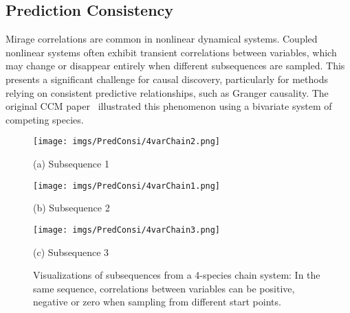 \subsection{Prediction Consistency}

Mirage correlations are common in nonlinear dynamical systems. Coupled nonlinear systems often exhibit transient correlations between variables, which may change or disappear entirely when different subsequences are sampled. This presents a significant challenge for causal discovery, particularly for methods relying on consistent predictive relationships, such as Granger causality. The original CCM paper~\cite{sugihara2012detecting} illustrated this phenomenon using a bivariate system of competing species.

\begin{figure}[htb]
    \centering
    \begin{minipage}[b]{0.31\linewidth}
        \centering
        \texttt{[image: imgs/PredConsi/4varChain2.png]}
        \captionsetup{justification=centering}
        \caption*{(a) Subsequence 1}
    \end{minipage}
    \begin{minipage}[b]{0.31\linewidth}
        \centering
        \texttt{[image: imgs/PredConsi/4varChain1.png]}
        \captionsetup{justification=centering}
        \caption*{(b) Subsequence 2}
    \end{minipage}
    \begin{minipage}[b]{0.31\linewidth}
        \centering
        \texttt{[image: imgs/PredConsi/4varChain3.png]}
        \captionsetup{justification=centering}
        \caption*{(c) Subsequence 3}
    \end{minipage}
    \caption{Visualizations of subsequences from a 4-species chain system: In the same sequence, correlations between variables can be positive, negative or zero when sampling from different start points.}
    \label{fig:4varChainNoNoise}
\end{figure}



